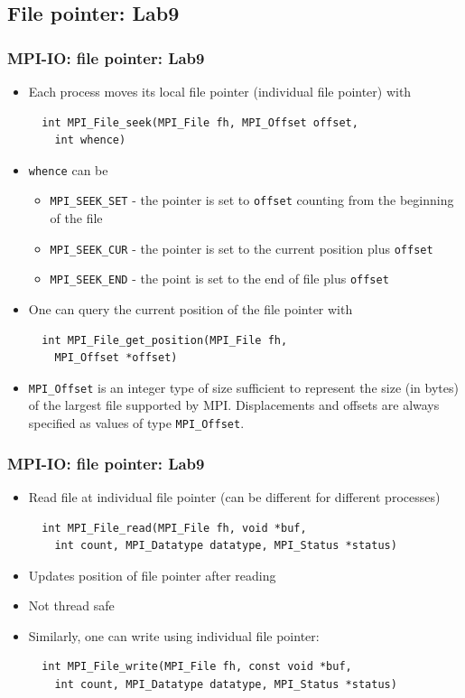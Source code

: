 \documentclass{beamer}
\begin{document}
\subsection{File pointer: Lab9}
\begin{frame}[fragile]
  \frametitle{MPI-IO: file pointer: Lab9}
\begin{itemize}
\item Each process moves its local file pointer (individual file pointer) with
{\color{mycolorcode}
\begin{verbatim}
  int MPI_File_seek(MPI_File fh, MPI_Offset offset, 
    int whence)
\end{verbatim}
}
\item {\color{mycolorcode}\verb|whence|} can be
\begin{itemize}
\item {\color{mycolorcode}\verb|MPI_SEEK_SET|} - the pointer is set to {\color{mycolorcode}\verb|offset|} counting from the beginning of the file
\item {\color{mycolorcode}\verb|MPI_SEEK_CUR|} - the pointer is set to the current position plus {\color{mycolorcode}\verb|offset|}
\item {\color{mycolorcode}\verb|MPI_SEEK_END|} - the point is set to the end of file plus {\color{mycolorcode}\verb|offset|}
\end{itemize}
\item One can query the current position of the file pointer with
{\color{mycolorcode}
\begin{verbatim}
  int MPI_File_get_position(MPI_File fh, 
    MPI_Offset *offset)
\end{verbatim}
}
\item {\color{mycolorcode}\verb|MPI_Offset|} is an integer type of size sufficient to represent the size (in bytes) of the largest
file supported by MPI. Displacements and offsets are always specified as values of type
{\color{mycolorcode}\verb|MPI_Offset|}.
\end{itemize}
\end{frame}

\begin{frame}[fragile]
  \frametitle{MPI-IO: file pointer: Lab9}
\begin{itemize}
\item Read file at individual file pointer (can be different for different processes)
{\color{mycolorcode}
\begin{verbatim}
  int MPI_File_read(MPI_File fh, void *buf, 
    int count, MPI_Datatype datatype, MPI_Status *status)
\end{verbatim}
}
\item Updates position of file pointer after reading
\item Not thread safe
\item Similarly, one can write using individual file pointer:
{\color{mycolorcode}
\begin{verbatim}
  int MPI_File_write(MPI_File fh, const void *buf, 
    int count, MPI_Datatype datatype, MPI_Status *status)
\end{verbatim}
}
\end{itemize}
\end{frame}
\end{document}
